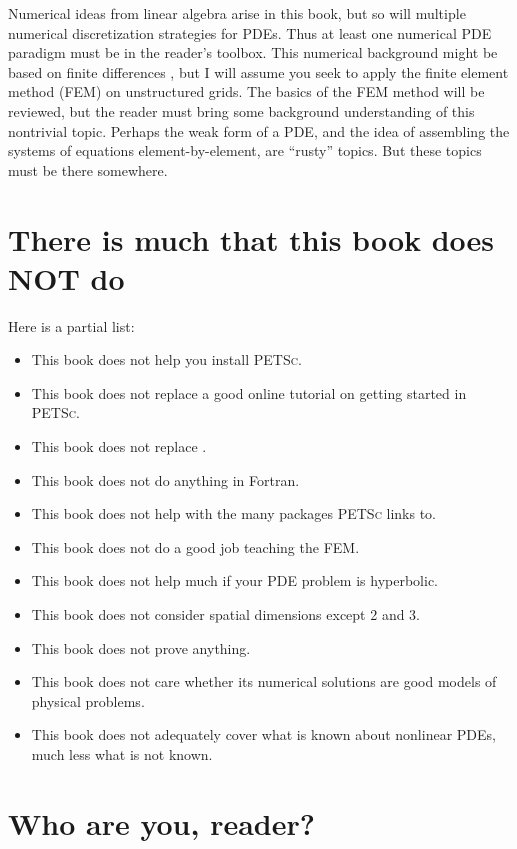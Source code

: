 \documentclass{tufte-book}
\newcommand{\PETSc}{\textsc{PETSc}\xspace}
\begin{document}
Numerical ideas from linear algebra \citep{TrefethenBau} arise in this book, but so will multiple numerical discretization strategies for PDEs.  Thus at least one numerical PDE paradigm must be in the reader's toolbox.  This numerical background might be based on finite differences \citep{MortonMayers}, but I will assume you seek to apply the finite element method (FEM) on unstructured grids.  The basics of the FEM method will be reviewed, but the reader must bring some background understanding of this nontrivial topic.  Perhaps the weak form of a PDE, and the idea of assembling the systems of equations element-by-element, are ``rusty'' topics.  But these topics must be there somewhere.


\section{There is much that this book does NOT do}  Here is a partial list:\begin{itemize}
\item This book does not help you install \PETSc.
\item This book does not replace a good online tutorial on getting started in \PETSc.
\item This book does not replace \citep{Smithetal1996}.
\item This book does not do anything in Fortran.
\item This book does not help with the many packages \PETSc links to.
\item This book does not do a good job teaching the FEM.
\item This book does not help much if your PDE problem is hyperbolic.
\item This book does not consider spatial dimensions except 2 and 3.
\item This book does not prove anything.
\item This book does not care whether its numerical solutions are good models of physical problems.
\item This book does not adequately cover what is known about nonlinear PDEs, much less what is not known.
\end{itemize}


\section{Who are you, reader?}  
\end{document}
